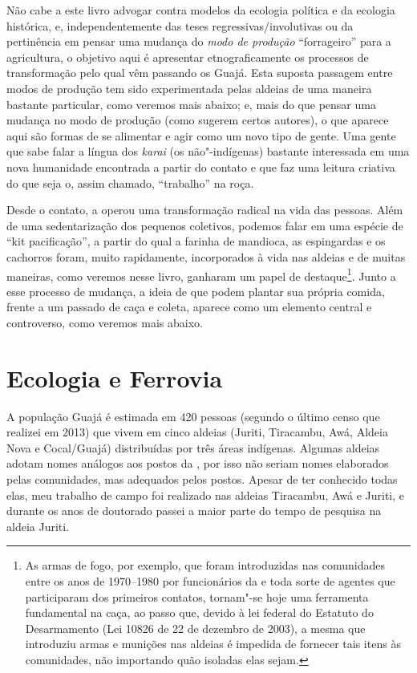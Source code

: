 Não cabe a este livro advogar contra modelos da ecologia política e da
ecologia histórica, e, independentemente das teses
regressivas/involutivas ou da pertinência em pensar uma mudança do
\emph{modo de produção} ``forrageiro'' para a agricultura, o objetivo
aqui é apresentar etnograficamente os processos de transformação pelo
qual vêm passando os Guajá. Esta suposta passagem entre modos de
produção tem sido experimentada pelas aldeias de uma maneira bastante
particular, como veremos mais abaixo; e, mais do que pensar uma mudança
no modo de produção (como sugerem certos autores), o que aparece aqui
são formas de se alimentar e agir como um novo tipo de gente. Uma gente
que sabe falar a língua dos \emph{karai} (os não"-indígenas) bastante
interessada em uma nova humanidade encontrada a partir do contato e que
faz uma leitura criativa do que seja o, assim chamado, ``trabalho'' na
roça.

Desde o contato, a  operou uma transformação radical na vida das
pessoas. Além de uma sedentarização dos pequenos coletivos, podemos
falar em uma espécie de ``kit pacificação'', a partir do qual a farinha
de mandioca, as espingardas e os cachorros foram, muito rapidamente,
incorporados à vida nas aldeias e de muitas maneiras, como veremos nesse
livro, ganharam um papel de destaque\footnote{As armas de fogo, por
  exemplo, que foram introduzidas nas comunidades entre os anos de
  1970--1980 por funcionários da  e toda sorte de agentes que
  participaram dos primeiros contatos, tornam"-se hoje uma ferramenta
  fundamental na caça, ao passo que, devido à lei federal do Estatuto do
  Desarmamento (Lei 10826 de 22 de dezembro de 2003), a mesma  que
  introduziu armas e munições nas aldeias é impedida de fornecer tais
  itens às comunidades, não importando quão isoladas elas sejam.}. Junto
a esse processo de mudança, a ideia de que podem plantar sua própria
comida, frente a um passado de caça e coleta, aparece como um elemento
central e controverso, como veremos mais abaixo.

\section{Ecologia e Ferrovia }

A população Guajá é estimada em 420 pessoas (segundo o último censo que
realizei em 2013) que vivem em cinco aldeias (Juriti, Tiracambu, Awá, Aldeia Nova e Cocal/Guajá) distribuídas por três áreas
indígenas. Algumas aldeias adotam nomes análogos aos postos da ,
por isso não seriam nomes elaborados pelas comunidades, mas adequados
pelos postos. Apesar de ter conhecido todas elas, meu trabalho de campo
foi realizado nas aldeias Tiracambu, Awá e Juriti, e durante os
anos de doutorado passei a maior parte do tempo de pesquisa na aldeia
Juriti.

